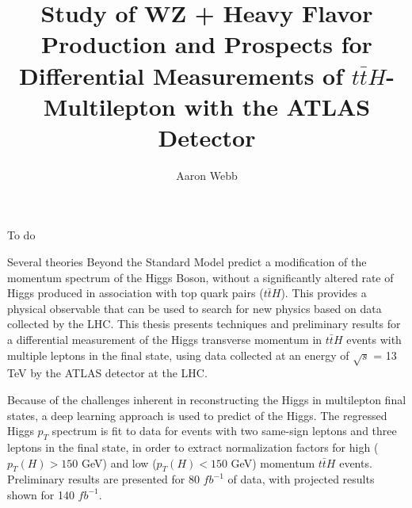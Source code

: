 \documentclass[12pt]{report}	%
\author{Aaron Webb}  	%
\title{Study of WZ + Heavy Flavor Production and Prospects for Differential Measurements of $t\bar{t}H$-Multilepton with the ATLAS Detector}
\theoremstyle{definition}
\theoremstyle{remark}
\begin{document}
\copyrightpage          %


%
%
%
\commcertpage           %

\titlepage              %


%


\begin{acknowledgments}		%
%
To do
\end{acknowledgments}


%
\utabstract
{}%
\indent

\par Several theories Beyond the Standard Model predict a modification of the momentum spectrum of the Higgs Boson, without a significantly altered rate of Higgs produced in association with top quark pairs ($t\bar{t}H$). This provides a physical observable that can be used to search for new physics based on data collected by the LHC. This thesis presents techniques and preliminary results for a differential measurement of the Higgs transverse momentum in $t\bar{t}H$ events with multiple leptons in the final state, using data collected at an energy of $\sqrt{s}$ = 13 TeV by the ATLAS detector at the LHC.

\par Because of the challenges inherent in reconstructing the Higgs in multilepton final states, a deep learning approach is used to predict of the Higgs. The regressed Higgs $p_T$ spectrum is fit to data for events with two same-sign leptons and three leptons in the final state, in order to extract normalization factors for high ($p_{T}(H) > 150$ GeV) and low ($p_{T}(H) < 150$ GeV) momentum $t\bar{t}H$ events. Preliminary results are presented for 80 $fb^{-1}$ of data, with projected results shown for 140 $fb^{-1}$.
\end{document}
